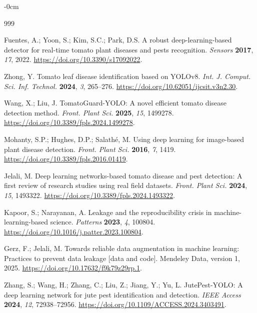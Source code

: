 \documentclass[sensors,article,submit,pdftex,moreauthors]{Definitions/mdpi}
\begin{document}
\begin{adjustwidth}{-\extralength}{0cm}
\begin{thebibliography}{999}

Fuentes, A.; Yoon, S.; Kim, S.C.; Park, D.S. A robust deep-learning-based detector for real-time tomato plant diseases and pests recognition. {\em Sensors} {\bf 2017}, {\em 17}, 2022. \url{https://doi.org/10.3390/s17092022}.

Zhong, Y. Tomato leaf disease identification based on YOLOv8. {\em Int. J. Comput. Sci. Inf. Technol.} {\bf 2024}, {\em 3}, 265--276. \url{https://doi.org/10.62051/ijcsit.v3n2.30}.

Wang, X.; Liu, J. TomatoGuard-YOLO: A novel efficient tomato disease detection method. {\em Front. Plant Sci.} {\bf 2025}, {\em 15}, 1499278. \url{https://doi.org/10.3389/fpls.2024.1499278}.

Mohanty, S.P.; Hughes, D.P.; Salath\'e, M. Using deep learning for image-based plant disease detection. {\em Front. Plant Sci.} {\bf 2016}, {\em 7}, 1419. \url{https://doi.org/10.3389/fpls.2016.01419}.

Jelali, M. Deep learning networks-based tomato disease and pest detection: A first review of research studies using real field datasets. {\em Front. Plant Sci.} {\bf 2024}, {\em 15}, 1493322. \url{https://doi.org/10.3389/fpls.2024.1493322}.

Kapoor, S.; Narayanan, A. Leakage and the reproducibility crisis in machine-learning-based science. {\em Patterns} {\bf 2023}, {\em 4}, 100804. \url{https://doi.org/10.1016/j.patter.2023.100804}.

{\color{blue} Gerz, F.; Jelali, M. Towards reliable data augmentation in machine learning: Practices to prevent data leakage [data and code]. Mendeley Data, version 1, 2025. \url{https://doi.org/10.17632/f9k79z29rp.1}.}

{\color{blue} Zhang, S.; Wang, H.; Zhang, C.; Liu, Z.; Jiang, Y.; Yu, L. JutePest-YOLO: A deep learning network for jute pest identification and detection. {\em IEEE Access} {\bf 2024}, {\em 12}, 72938--72956. \url{https://doi.org/10.1109/ACCESS.2024.3403491}.}


\end{thebibliography}
\end{adjustwidth}
\end{document}
